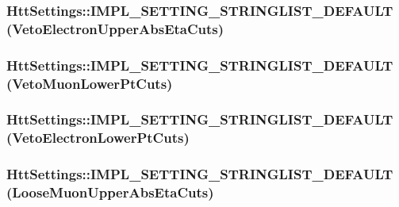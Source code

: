 \label{classHttSettings_a8b698b24a00bf7a7d9f7cba39c21458b}
\hypertarget{classHttSettings_a780edfbc710a9b491ed7537ead27225a}{
\subsubsection[{IMPL\_\-SETTING\_\-STRINGLIST\_\-DEFAULT}]{\setlength{\rightskip}{0pt plus 5cm}HttSettings::IMPL\_\-SETTING\_\-STRINGLIST\_\-DEFAULT (VetoElectronUpperAbsEtaCuts)}}
\label{classHttSettings_a780edfbc710a9b491ed7537ead27225a}
\hypertarget{classHttSettings_aeb8a93b9a912f8e04e639c8b85f128ef}{
\subsubsection[{IMPL\_\-SETTING\_\-STRINGLIST\_\-DEFAULT}]{\setlength{\rightskip}{0pt plus 5cm}HttSettings::IMPL\_\-SETTING\_\-STRINGLIST\_\-DEFAULT (VetoMuonLowerPtCuts)}}
\label{classHttSettings_aeb8a93b9a912f8e04e639c8b85f128ef}
\hypertarget{classHttSettings_ad96b23461ccea7e7983ff584eda33824}{
\subsubsection[{IMPL\_\-SETTING\_\-STRINGLIST\_\-DEFAULT}]{\setlength{\rightskip}{0pt plus 5cm}HttSettings::IMPL\_\-SETTING\_\-STRINGLIST\_\-DEFAULT (VetoElectronLowerPtCuts)}}
\label{classHttSettings_ad96b23461ccea7e7983ff584eda33824}
\hypertarget{classHttSettings_a05ff7c3b228a631bc3e5b7a0682a57ce}{
\subsubsection[{IMPL\_\-SETTING\_\-STRINGLIST\_\-DEFAULT}]{\setlength{\rightskip}{0pt plus 5cm}HttSettings::IMPL\_\-SETTING\_\-STRINGLIST\_\-DEFAULT (LooseMuonUpperAbsEtaCuts)}}
